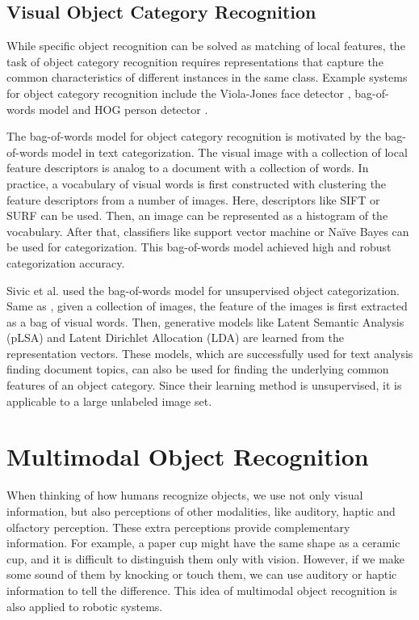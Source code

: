 \subsection{Visual Object Category Recognition}
While specific object recognition can be solved as matching of local features, the task of object category recognition requires representations that capture the common characteristics of different instances in the same class. Example systems for object category recognition include the Viola-Jones face detector \cite{viola_rapid_2001}, bag-of-words model \cite{csurka_visual_2004} and HOG person detector \cite{dalal_histograms_2005}. 

The bag-of-words model \cite{csurka_visual_2004} for object category recognition is motivated by the bag-of-words model in text categorization. The visual image with a collection of local feature descriptors is analog to a document with a collection of words. In practice, a vocabulary of visual words is first constructed with clustering the feature descriptors from a number of images. Here, descriptors like SIFT or SURF can be used. Then, an image can be represented as a histogram of the vocabulary. After that, classifiers like support vector machine or Na\"ive Bayes can be used for categorization. This bag-of-words model achieved high and robust categorization accuracy.

Sivic et al. \cite{sivic_discovering_2005} used the bag-of-words model for unsupervised object categorization. Same as \cite{csurka_visual_2004}, given a collection of images, the feature of the images is first extracted as a bag of visual words. Then, generative models like Latent Semantic Analysis (pLSA) and Latent Dirichlet Allocation (LDA) are learned from the representation vectors. These models, which are successfully used for text analysis finding document topics, can also be used for finding the underlying common features of an object category. Since their learning method is unsupervised, it is applicable to a large unlabeled image set.

\section{Multimodal Object Recognition}
When thinking of how humans recognize objects, we use not only visual information, but also perceptions of other modalities, like auditory, haptic and olfactory perception. These extra perceptions provide complementary information. For example, a paper cup might have the same shape as a ceramic cup, and it is difficult to distinguish them only with vision. However, if we make some sound of them by knocking or touch them, we can use auditory or haptic information to tell the difference. This idea of multimodal object recognition is also applied to robotic systems.

